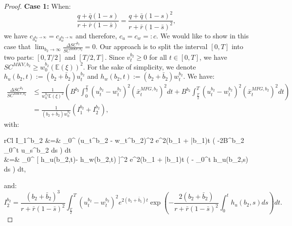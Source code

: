 \documentclass[11pt]{article}
\begin{document}
\begin{proof}
	\textbf{Case 1:} When:
	\begin{equation*}
	\frac{q+\bar{q}(1-s)}{r+\bar{r}(1-\bar{s})}=\frac{q+\bar{q}(1-s)^2}{r+\bar{r}(1-\bar{s})^2},
	\end{equation*}
	we have $c_{\delta_u^{b_2 \to \infty}}=c_{\delta_w^{b_2 \to \infty}}$ and therefore, $c_u = c_w =: c$. 
	We would like to show in this case that $\lim_{b_2 \to \infty} \frac{\Delta SC^{b_2}}{SC^{MKV,b_2}} = 0$. Our approach is to split the interval $[0,T]$ into two parts: $[0,T/2]$ and $[T/2,T]$.	
	Since $v^{b_2}_t \geq 0$ for all $t\in [0,T]$, we have $SC^{MKV,b_2} \geq w_0^{b_2} (\mathbb{E}(\xi))^2$.	For the sake of simplicity, we denote $h_u(b_2,t) := (b_2 + \bar{b}_2) u_{t}^{b_2}$ and $h_w(b_2,t) := (b_2 + \bar{b}_2)w_t^{b_2}$. We have:
	\begin{equation}
	\begin{split}
		\frac{\Delta SC^{b_2}}{SC^{MKV,b_2}} &\leq \frac{1}{w_0^{b_2} \mathbb{E}(\xi)^2 } \left( B^{b_2} \int_{0}^{\frac{T}{2}} (u_t^{b_2} - w_t^{b_2})^2 (\bar{x}_t^{MFG,b_2})^2 dt + B^{b_2} \int_{\frac{T}{2}}^{T} (u_t^{b_2} - w_t^{b_2})^2 (\bar{x}_t^{MFG,b_2})^2 dt \right) \\ 
		&=  \frac{1}{(b_2 + \bar{b}_2) w_0^{b_2} } \left( I_1^{b_2} + I_2^{b_2} \right),
	\end{split}
	\label{eq:I_1_plus_I_2}
	\end{equation}
	with:
	\begin{IEEEeqnarray*}{rCl}
	I_1^{b_2} &=&   \int_0^{} (u_t^{b_2} - w_t^{b_2})^2 e^{2(b_1 + \bar{b}_1)t} \exp \left( -2B^{b_2} \int_0^{t} u_s^{b_2} ds 
	\right) dt \\
	&=&  \int_0^{} [ h_u(b_2,t)- h_w(b_2,t) ]^2 \cdot e^{2(b_1 + \bar{b}_1)t} \exp \left( -   \int_0^t h_u(b_2,s) ds \right) dt, 
	\end{IEEEeqnarray*}
	and:
	$$
		I_2^{b_2} = \frac{(b_2 + \bar{b}_2)^3}{r + \bar{r}(1-\bar{s})^2}  \int_{\frac{T}{2}}^T (u_t^{b_2} - w_t^{b_2})^2 e^{2(b_1 + \bar{b}_1)t} \exp \left( -\frac{2 (b_2 + \bar{b}_2)}{r + \bar{r}(1-\bar{s})^2} \int_0^{t} h_u(b_2,s) ds \right) dt.
	$$
	

\end{proof}
\end{document}
